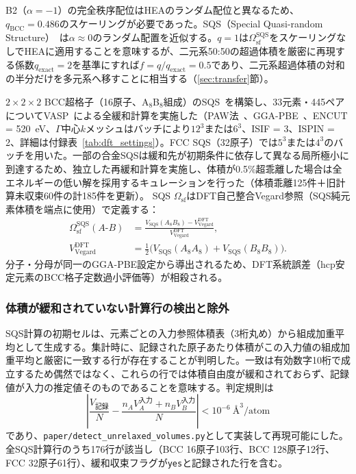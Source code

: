 \documentclass[5p,10pt]{elsarticle}
\begin{document}
B2（$\alpha = -1$）の完全秩序配位はHEAのランダム配位と異なるため、$q_\text{BCC} = 0.486$のスケーリングが必要であった。SQS（Special Quasi-random Structure）~\cite{Zunger1990,Jiang2004}は$\alpha \approx 0$のランダム配置を近似する。$q=1$は$\Omega_\text{sf}^\text{SQS}$をスケーリングなしでHEAに適用することを意味するが、二元系50:50の超過体積を厳密に再現する係数$q_\text{exact}=2$を基準にすれば$f=q/q_\text{exact}=0.5$であり、二元系超過体積の対和の半分だけを多元系へ移すことに相当する（\ref{sec:transfer}節）。

$2\times2\times2$ BCC超格子（16原子、A$_8$B$_8$組成）のSQS~\cite{Zunger1990,vandeWalle2013}を構築し、33元素・445ペアについてVASP~\cite{Kresse1996}による全緩和計算を実施した（PAW法~\cite{Blochl1994}、GGA-PBE~\cite{Perdew1996}、ENCUT = 520~eV、$\Gamma$中心$k$メッシュはバッチにより$12^3$または$6^3$、ISIF = 3、ISPIN = 2、詳細は付録表~\ref{tab:dft_settings}）。FCC SQS（32原子）では$5^3$または$4^3$のバッチを用いた。一部の合金SQSは緩和先が初期条件に依存して異なる局所極小に到達するため、独立した再緩和計算を実施し、体積が0.5\%超乖離した場合は全エネルギーの低い解を採用するキュレーションを行った（体積乖離125件＋旧計算未収束60件の計185件を更新）。
SQS $\Omega_\text{sf}$はDFT自己整合Vegard参照（SQS純元素体積を端点に使用）で定義する：
\begin{align}
  \Omega_\text{sf}^\text{SQS}(A\text{-}B) &=
  \frac{V_\text{SQS}(A_8 B_8) - V_\text{Vegard}^\text{DFT}}{V_\text{Vegard}^\text{DFT}},
  \label{eq:omega_sqs} \\
  V_\text{Vegard}^\text{DFT} &= \tfrac{1}{2}\bigl(V_\text{SQS}(A_8 A_8) + V_\text{SQS}(B_8 B_8)\bigr).
  \label{eq:vegard_dft}
\end{align}
分子・分母が同一のGGA-PBE設定から導出されるため、DFT系統誤差（hcp安定元素のBCC格子定数過小評価等）が相殺される。

\subsubsection{体積が緩和されていない計算行の検出と除外}
\label{sec:unrelaxed_screening}

SQS計算の初期セルは、元素ごとの入力参照体積表（3桁丸め）から組成加重平均として生成する。集計時に、記録された原子あたり体積がこの入力値の組成加重平均と厳密に一致する行が存在することが判明した。一致は有効数字10桁で成立するため偶然ではなく、これらの行では体積自由度が緩和されておらず、記録値が入力の推定値そのものであることを意味する。判定規則は
\begin{equation}
  \left|\frac{V_\text{記録}}{N} - \frac{n_A V_A^\text{入力} + n_B V_B^\text{入力}}{N}\right| < 10^{-6}~\text{\AA}^3/\text{atom}
  \label{eq:unrelaxed_rule}
\end{equation}
であり、\texttt{paper/detect\_unrelaxed\_volumes.py}として実装して再現可能にした。全SQS計算行のうち176行が該当し（BCC 16原子103行、BCC 128原子12行、FCC 32原子61行）、緩和収束フラグが\texttt{yes}と記録された行を含む。
\end{document}

